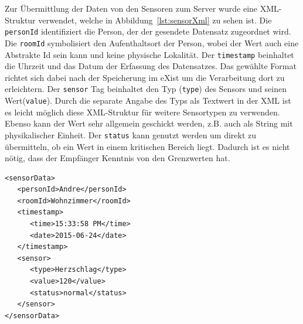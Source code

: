 Zur Übermittlung der Daten von den Sensoren zum Server wurde eine XML-Struktur verwendet, welche in Abbildung~\ref{lst:sensorXml} zu sehen ist.
Die \texttt{personId} identifiziert die Person, der der gesendete Datensatz zugeordnet wird. Die \texttt{roomId} symbolisiert den Aufenthaltsort der Person, wobei der Wert auch eine Abstrakte Id sein kann und keine physische Lokalität. Der \texttt{timestamp} beinhaltet die Uhrzeit und das Datum der Erfassung des Datensatzes. Das gewählte Format richtet sich dabei nach der Speicherung im eXist um die Verarbeitung dort zu erleichtern. Der \texttt{sensor} Tag beinhaltet den Typ (\texttt{type}) des Sensors und seinen Wert(\texttt{value}). Durch die separate Angabe des Typs als Textwert in der XML ist es leicht möglich diese XML-Struktur für weitere Sensortypen zu verwenden. Ebenso kann der Wert sehr allgemein geschickt werden, z.B. auch als String mit physikalischer Einheit. Der \texttt{status} kann genutzt werden um direkt zu übermitteln, ob ein Wert in einem kritischen Bereich liegt. Dadurch ist es nicht nötig, dass der Empfänger Kenntnis von den Grenzwerten hat.


\begin{lstlisting}[caption={SensorXML},label=lst:sensorXml]
<sensorData>
   <personId>Andre</personId>
   <roomId>Wohnzimmer</roomId>
   <timestamp>
      <time>15:33:58 PM</time>
      <date>2015-06-24</date>
   </timestamp>
   <sensor>
      <type>Herzschlag</type>
      <value>120</value>
      <status>normal</status>
   </sensor>
</sensorData>
\end{lstlisting}